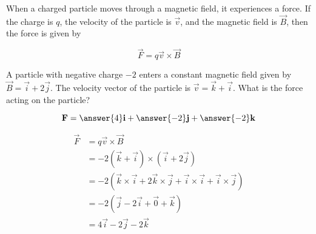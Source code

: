 \documentclass{ximera}
\begin{document}
When a charged particle moves through a magnetic field, it experiences a force.  If the charge is $q$, the velocity of the particle is $\vec{v}$, and the magnetic field is $\vec{B}$, then the force is given by

\[
\vec{F} = q\vec{v} \times \vec{B}
\]

\begin{question}
	A particle with negative charge $-2$ enters a constant magnetic field given by $\vec{B} = \vec{i}+2\vec{j}$.  The velocity vector of the particle is  $\vec{v} = \vec{k}+\vec{i}$.  What is the force acting on the particle?
	
	\[
	\vec{F} = \answer{4}\vec{i}+\answer{-2}\vec{j}+\answer{-2}\vec{k}
	\]
	
	\begin{hint}
		\begin{align*}
			\vec{F} &= q\vec{v} \times \vec{B}\\
				&= -2 ( \vec{k}+\vec{i}) \times (\vec{i}+2\vec{j})\\
				&=-2( \vec{k} \times \vec{i}+2\vec{k} \times \vec{j}+\vec{i} \times \vec{i}+\vec{i} \times \vec{j})\\
				&=-2(\vec{j}-2\vec{i}+\vec{0}+\vec{k})\\
				&=4\vec{i}-2\vec{j}-2\vec{k}
		\end{align*}
	\end{hint}
\end{question}

	
\end{document}
